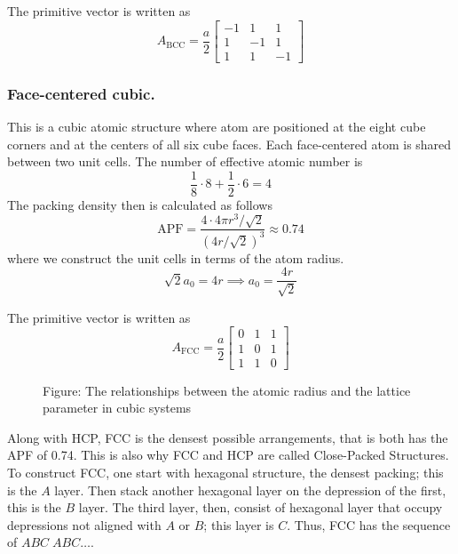 \documentclass[../../../main.tex]{subfiles}
\begin{document}
The primitive vector is written as
\begin{equation*}
    A_{\text{BCC}} = \frac{a}{2}
    \begin{bmatrix}
        -1 & 1  & 1  \\
        1  & -1 & 1  \\
        1  & 1  & -1
    \end{bmatrix}
\end{equation*}

\subsubsection{Face-centered cubic.}
This is a cubic atomic structure where atom are positioned at the eight cube corners and at the centers of all six cube faces.
Each face-centered atom is shared between two unit cells.
The number of effective atomic number is
\begin{equation*}
    \frac{1 }{8 }\cdot 8+\frac{1 }{2 }\cdot 6=4
\end{equation*}
The packing density then is calculated as follows
\begin{equation*}
    \text{APF}=\frac{4 \cdot 4\pi r^3/\sqrt{2} }{(4r/\sqrt{2})^3}\approx 0.74
\end{equation*}
where we construct the unit cells in terms of the atom radius.
\begin{equation*}
    \sqrt{2} a_0=4r \implies a_0=\frac{4r }{\sqrt{2}}
\end{equation*}

The primitive vector is written as
\begin{equation*}
    A_{\text{FCC}} = \frac{a}{2}
    \begin{bmatrix}
        0 & 1 & 1 \\
        1 & 0 & 1 \\
        1 & 1 & 0
    \end{bmatrix}
\end{equation*}

\begin{figure}[]
    \centering
    \caption*{Figure: The relationships between the atomic radius and the lattice parameter in cubic systems}
\end{figure}

Along with HCP, FCC is the densest possible arrangements, that is both has the APF of 0.74.
This is also why FCC and HCP are called Close-Packed Structures.
To construct FCC, one start with hexagonal structure, the densest packing; this is the $A$ layer.
Then stack another hexagonal layer on the depression of the first, this is the $B$ layer.
The third layer, then, consist of hexagonal layer that occupy depressions not aligned with $A$ or $B$; this layer is $C$.
Thus, FCC has the sequence of $ABC\;ABC\dots$.
\end{document}
